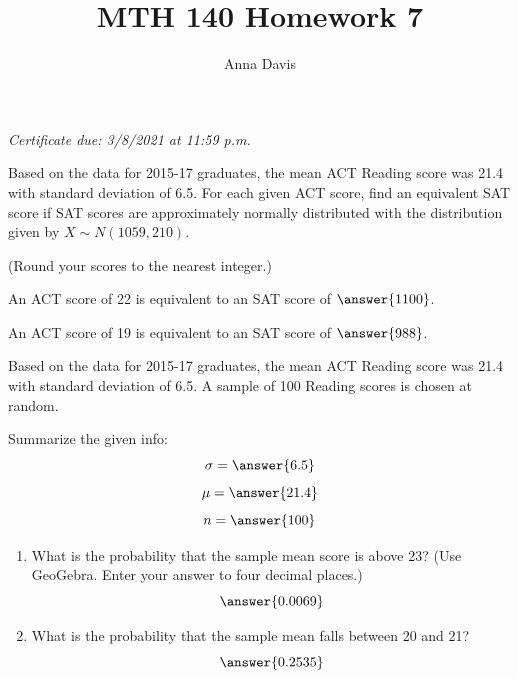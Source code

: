 \documentclass{ximera}
\author{Anna Davis} \title{MTH 140 Homework 7}
\begin{document}
\begin{abstract}

\end{abstract}
\maketitle
 \textit{Certificate due: 3/8/2021 at 11:59 p.m.}
 
 
 \begin{problem}\label{prob:140hom7extra1}
 Based on the data for 2015-17 graduates, the mean ACT Reading score was 21.4 with standard deviation of 6.5.  For each given ACT score, find an equivalent SAT score if SAT scores are approximately normally distributed with the distribution given by $X\sim N(1059,210)$.
 
 (Round your scores to the nearest integer.)
 
 An ACT score of 22 is equivalent to an SAT score of $\answer{1100}$.
 
 An ACT score of 19 is equivalent to an SAT score of $\answer{988}$.
 
 \end{problem}
 
  \begin{problem}\label{prob:140hom6prob2}
 Based on the data for 2015-17 graduates, the mean ACT Reading score was 21.4 with standard deviation of 6.5.  A sample of 100 Reading scores is chosen at random. 
 
 Summarize the given info:
$$\sigma=\answer{6.5}$$
$$\mu=\answer{21.4}$$
$$n=\answer{100}$$

\begin{center}  
\end{center}
\begin{enumerate}
\item
What is the probability that the sample mean score is above 23?  (Use GeoGebra.  Enter your answer to four decimal places.)
$$\answer{0.0069}$$
\item What is the probability that the sample mean falls between 20 and 21?
$$\answer{0.2535}$$
\end{enumerate}
\end{problem}
\end{document}
